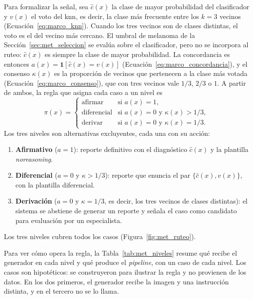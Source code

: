 Para formalizar la señal, sea $\hat{c}(x)$ la clase de mayor probabilidad del clasificador y $v(x)$ el voto del
\gls{knn}, es decir, la clase más frecuente entre los $k = 3$ vecinos (Ecuación~\ref{eq:marco_knn}). Cuando los tres
vecinos son de clases distintas, el voto es el del vecino más cercano. El umbral de melanoma de la Sección~\ref{sec:met_seleccion} se evalúa sobre el clasificador, pero no se incorpora al ruteo: $\hat{c}(x)$ es siempre la clase de mayor probabilidad. La concordancia es entonces
$a(x) = \mathbf{1}[\hat{c}(x) = v(x)]$ (Ecuación~\ref{eq:marco_concordancia}), y el consenso $\kappa(x)$ es la
proporción de vecinos que pertenecen a la clase más votada (Ecuación~\ref{eq:marco_consenso}), que con tres vecinos
vale $1/3$, $2/3$ o $1$. A partir de ambos, la regla que asigna cada caso a un nivel es
\begin{equation}
    \pi(x) =
    \begin{cases}
        \text{afirmar} & \text{si } a(x) = 1,\\
        \text{diferencial} & \text{si } a(x) = 0 \text{ y } \kappa(x) > 1/3,\\
        \text{derivar} & \text{si } a(x) = 0 \text{ y } \kappa(x) = 1/3.
    \end{cases}
    \label{eq:met_politica_ruteo}
\end{equation}
Los tres niveles son alternativas excluyentes, cada una con su acción:
\begin{enumerate}
    \item \textbf{Afirmativo} ($a = 1$): reporte definitivo con el diagnóstico $\hat{c}(x)$ y la plantilla
    \emph{noreasoning}.
    \item \textbf{Diferencial} ($a = 0$ y $\kappa > 1/3$): reporte que enuncia el par $\{\hat{c}(x), v(x)\}$, con la
    plantilla diferencial.
    \item \textbf{Derivación} ($a = 0$ y $\kappa = 1/3$, es decir, los tres vecinos de clases distintas): el sistema se abstiene de generar un reporte y señala el caso como candidato para evaluación por un especialista.
\end{enumerate}
Los tres niveles cubren todos los casos (Figura~\ref{fig:met_ruteo}).



Para ver cómo opera la regla, la Tabla~\ref{tab:met_niveles} resume qué recibe el generador en cada nivel y qué
produce el \emph{pipeline}, con un caso de cada nivel. Los casos son hipotéticos: se construyeron para ilustrar la
regla y no provienen de los datos. En los dos primeros, el generador recibe la imagen y una instrucción distinta, y
en el tercero no se lo llama.

